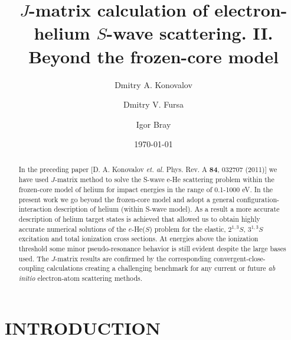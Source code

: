 \documentclass[aip
, pra
, showpacs
, aps
, twocolumn
, groupedaddress
, floatfix
]{revtex4}
\begin{document}
\title {$J$-matrix calculation of electron-helium $S$-wave scattering. II. Beyond the frozen-core model}

\author{Dmitry A. Konovalov}

\author{Dmitry V. Fursa}

\author{Igor Bray}



\date{\today}

\begin{abstract}
In the preceding paper  [D. A. Konovalov {\em et. al.} Phys. Rev. A {\bf 84}, 032707 (2011)] we have used 
$J$-matrix method to solve  the S-wave e-He scattering problem within the frozen-core model of helium for impact energies in the range of 0.1-1000 eV. 
In the present work we go beyond the frozen-core model and adopt a general configuration-interaction description of helium (within S-wave model). 
As a result a more accurate description of helium target states is achieved that allowed us to obtain highly
accurate numerical solutions of the
$e$-He($S$) problem
for the elastic, $2^{1,3}S$, $3^{1,3}S$ excitation and total ionization cross sections.
At energies above the ionization threshold some minor pseudo-resonance behavior is still evident despite the large bases used.
The $J$-matrix results are confirmed by the corresponding convergent-close-coupling calculations creating a challenging benchmark
for any current or future {\it ab initio} electron-atom scattering methods.



\end{abstract}

\maketitle



\section{INTRODUCTION}
\end{document}
